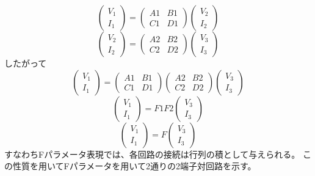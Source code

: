 \begin{equation*}
    \begin{pmatrix}V_1\\I_1\end{pmatrix} = \begin{pmatrix}A1&B1\\C1&D1\end{pmatrix}\begin{pmatrix}V_2\\I_2\end{pmatrix}
\end{equation*}
\begin{equation*}
    \begin{pmatrix}V_2\\I_2\end{pmatrix} = \begin{pmatrix}A2&B2\\C2&D2\end{pmatrix}\begin{pmatrix}V_3\\I_3\end{pmatrix}
\end{equation*}
したがって
\begin{equation*}
    \begin{pmatrix}V_1\\I_1\end{pmatrix} = \begin{pmatrix}A1&B1\\C1&D1\end{pmatrix}\begin{pmatrix}A2&B2\\C2&D2\end{pmatrix}\begin{pmatrix}V_3\\I_3\end{pmatrix}
\end{equation*}
\begin{equation*}
    \begin{pmatrix}V_1\\I_1\end{pmatrix} = F1 F2 \begin{pmatrix}V_3\\I_3\end{pmatrix}
\end{equation*}
\begin{equation*}
    \begin{pmatrix}V_1\\I_1\end{pmatrix} = F \begin{pmatrix}V_3\\I_3\end{pmatrix}
\end{equation*}
すなわちFパラメータ表現では、各回路の接続は行列の積として与えられる。
この性質を用いてFパラメータを用いて2通りの2端子対回路を示す。
